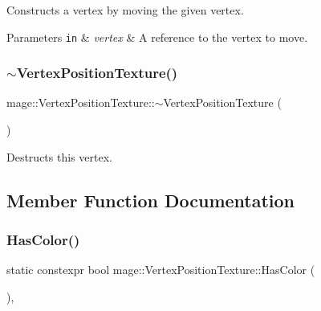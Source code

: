 Constructs a vertex by moving the given vertex.


\begin{DoxyParams}[1]{Parameters}
\mbox{\tt in}  & {\em vertex} & A reference to the vertex to move. \\
\hline
\end{DoxyParams}
\hypertarget{structmage_1_1_vertex_position_texture_abafd9b5ff2067834916b522d58b5764f}{}\label{structmage_1_1_vertex_position_texture_abafd9b5ff2067834916b522d58b5764f} 
\subsubsection{\texorpdfstring{$\sim$\+Vertex\+Position\+Texture()}{~VertexPositionTexture()}}
{\footnotesize\ttfamily mage\+::\+Vertex\+Position\+Texture\+::$\sim$\+Vertex\+Position\+Texture (\begin{DoxyParamCaption}{ }\end{DoxyParamCaption})\hspace{0.3cm}{\ttfamily [default]}}

Destructs this vertex. 

\subsection{Member Function Documentation}
\hypertarget{structmage_1_1_vertex_position_texture_ae25de798fcf1dd6383ed9b85e20cae54}{}\label{structmage_1_1_vertex_position_texture_ae25de798fcf1dd6383ed9b85e20cae54} 
\subsubsection{\texorpdfstring{Has\+Color()}{HasColor()}}
{\footnotesize\ttfamily static constexpr bool mage\+::\+Vertex\+Position\+Texture\+::\+Has\+Color (\begin{DoxyParamCaption}{ }\end{DoxyParamCaption})\hspace{0.3cm}{\ttfamily [static]}, {\ttfamily [noexcept]}}

